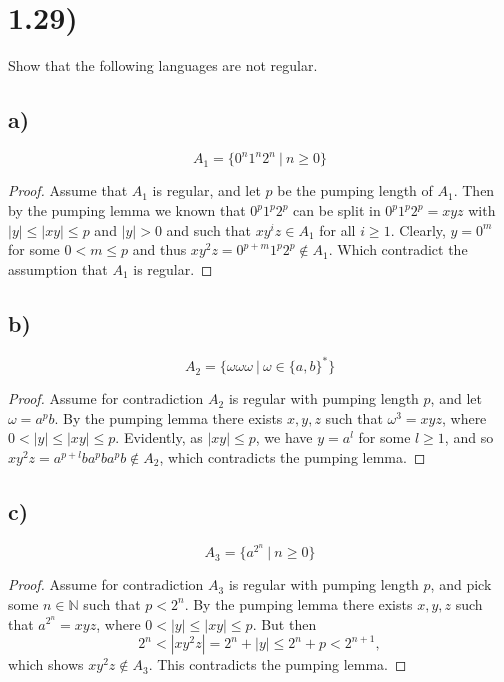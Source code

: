 \documentclass[a4paper,11pt]{article}
\newcommand{\abs}[1]{\left\lvert #1 \right\rvert}
\newcommand{\N}{\mathbb{N}}
\numberwithin{equation}{section}
\begin{document}
\section*{1.29)}
Show that the following languages are not regular.
\subsection*{a)}
\begin{equation}
    A_1=\{0^n1^n2^n\ \vert\ n\geq 0\}
    \end{equation}
    \begin{proof}
    Assume that $A_1$ is regular, and let $p$ be the pumping length of $A_1$. Then by the pumping lemma we known that $0^p1^p2^p$ can be split in $0^p1^p2^p=xyz$ with $\abs{y}\leq\abs{xy}\leq p$ and $\abs{y}>0$ and such that $xy^iz\in A_1$ for all $i\geq 1$. Clearly, $y=0^m$ for some $0<m\leq p$ and thus $xy^2z=0^{p+m}1^p2^p\notin A_1$. Which contradict the assumption that $A_1$ is regular.  
    \end{proof}
\subsection*{b)}
\begin{equation*}
    A_2=\{\omega\omega\omega\ \vert\ \omega\in\{a,b\}^\ast\}
\end{equation*}
    \begin{proof}
    Assume for contradiction $A_2$ is regular with pumping length $p$, and let $\omega = a^pb$. By the pumping lemma there exists $x,y,z$ such that $\omega^3 = xyz$, where $0<\abs{y}\leq \abs{xy} \leq p$. Evidently, as $\abs{xy}\leq p$, we have $y = a^l$ for some $l\geq 1$, and so $xy^2z = a^{p+l}ba^pba^pb\notin A_2$, which contradicts the pumping lemma.
    \end{proof}
\subsection*{c)}
\begin{equation*}
    A_3=\{a^{2^n}\ \vert\ n\geq 0\}
\end{equation*}
    \begin{proof}
    Assume for contradiction $A_3$ is regular with pumping length $p$, and pick some $n\in\N$ such that $p < 2^n$. By the pumping lemma there exists $x,y,z$ such that $a^{2^n} = xyz$, where $0<\abs{y}\leq\abs{xy}\leq p$. But then
    $$ 2^n < \abs{xy^2z} = 2^n + \abs{y} \leq 2^n + p < 2^{n+1}, $$
    which shows $xy^2z\notin A_3$. This contradicts the pumping lemma.
    \end{proof}
\end{document}
